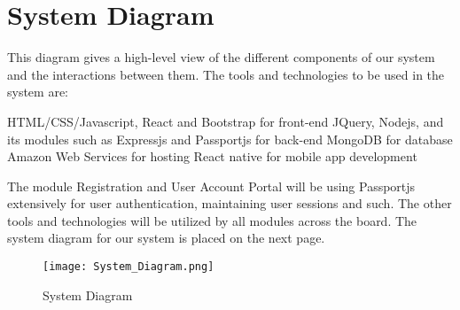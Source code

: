 \section{System Diagram}
This diagram gives a high-level view of the different components of our system and the interactions between them.
The tools and technologies to be used in the system are:
\begin{outline}
    \1 HTML/CSS/Javascript, React and Bootstrap for front-end
    \1 JQuery, Nodejs, and its modules such as Expressjs and Passportjs for back-end
    \1 MongoDB for database
    \1 Amazon Web Services for hosting
    \1 React native for mobile app development
\end{outline}
The module Registration and User Account Portal will be using Passportjs extensively for user authentication, maintaining user sessions and such. The other tools and technologies will be utilized by all modules across the board.
    The system diagram for our system is placed on the next page.

\begin{figure}
  \caption{System Diagram}
  \texttt{[image: System\_Diagram.png]}
  \centering
\end{figure}